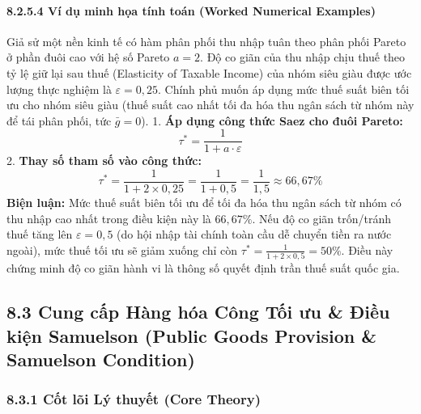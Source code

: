\documentclass[
]{article}
\begin{document}
\paragraph{8.2.5.4 Ví dụ minh họa tính toán (Worked Numerical
Examples)}\label{vuxed-dux1ee5-minh-hux1ecda-tuxednh-touxe1n-worked-numerical-examples-26}

Giả sử một nền kinh tế có hàm phân phối thu nhập tuân theo phân phối
Pareto ở phần đuôi cao với hệ số Pareto \(a = 2\). Độ co giãn của thu
nhập chịu thuế theo tỷ lệ giữ lại sau thuế (Elasticity of Taxable
Income) của nhóm siêu giàu được ước lượng thực nghiệm là
\(\varepsilon = 0,25\). Chính phủ muốn áp dụng mức thuế suất biên tối ưu
cho nhóm siêu giàu (thuế suất cao nhất tối đa hóa thu ngân sách từ nhóm
này để tái phân phối, tức \(\bar{g} = 0\)). 1. \textbf{Áp dụng công thức
Saez cho đuôi Pareto:} \[\tau^* = \frac{1}{1 + a \cdot \varepsilon}\] 2.
\textbf{Thay số tham số vào công thức:}
\[\tau^* = \frac{1}{1 + 2 \times 0,25} = \frac{1}{1 + 0,5} = \frac{1}{1,5} \approx 66,67\%\]
\textbf{Biện luận:} Mức thuế suất biên tối ưu để tối đa hóa thu ngân
sách từ nhóm có thu nhập cao nhất trong điều kiện này là \(66,67\%\).
Nếu độ co giãn trốn/tránh thuế tăng lên \(\varepsilon = 0,5\) (do hội
nhập tài chính toàn cầu dễ chuyển tiền ra nước ngoài), mức thuế tối ưu
sẽ giảm xuống chỉ còn \(\tau^* = \frac{1}{1 + 2 \times 0,5} = 50\%\).
Điều này chứng minh độ co giãn hành vi là thông số quyết định trần thuế
suất quốc gia.

\subsection{8.3 Cung cấp Hàng hóa Công Tối ưu \& Điều kiện Samuelson
(Public Goods Provision \& Samuelson
Condition)}\label{cung-cux1ea5p-huxe0ng-huxf3a-cuxf4ng-tux1ed1i-ux1b0u-ux111iux1ec1u-kiux1ec7n-samuelson-public-goods-provision-samuelson-condition}

\subsubsection{8.3.1 Cốt lõi Lý thuyết (Core
Theory)}\label{cux1ed1t-luxf5i-luxfd-thuyux1ebft-core-theory-27}
\end{document}

